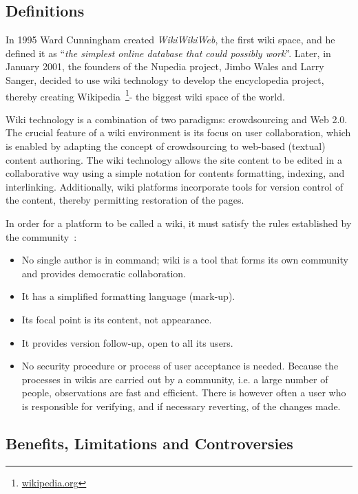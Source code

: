 \documentclass[PhD, Submit, ngerman,UKenglish,table]{scrbook}
\begin{document}
\subsection{Definitions}

In 1995 Ward Cunningham created \emph{WikiWikiWeb}, the first wiki space, and he defined it as ``\emph{the simplest online database that could possibly work}''.
Later, in January 2001, the founders of the Nupedia project, Jimbo Wales and Larry Sanger, decided to use wiki technology to develop the encyclopedia project, thereby creating Wikipedia~\footnote{\url{wikipedia.org}}- the biggest wiki space of the world.

Wiki technology is a combination of two paradigms: crowdsourcing and Web 2.0.
The crucial feature of a wiki environment is its focus on user collaboration, which is enabled by adapting the concept of crowdsourcing to web-based (textual) content authoring. 
The wiki technology allows the site content to be edited in a collaborative way using a simple notation for contents formatting, indexing, and interlinking.
Additionally, wiki platforms incorporate tools for version control of the content, thereby permitting restoration of the pages.

In order for a platform to be called a wiki, it must satisfy the rules established by the community~\cite{Gokcearslan2011}:
\begin{itemize}
\item No single author is in command; wiki is a tool that forms its own community and provides democratic collaboration.
\item It has a simplified formatting language (mark-up).
\item Its focal point is its content, not appearance.
\item It provides version follow-up, open to all its users.
\item No security procedure or process of user acceptance is needed. Because the processes in wikis are carried out by a community, i.e. a large number of people, observations are fast and efficient. There is however often a user who is responsible for verifying, and if necessary reverting, of the changes made.
\end{itemize}

\subsection{Benefits, Limitations and Controversies}
\end{document}
